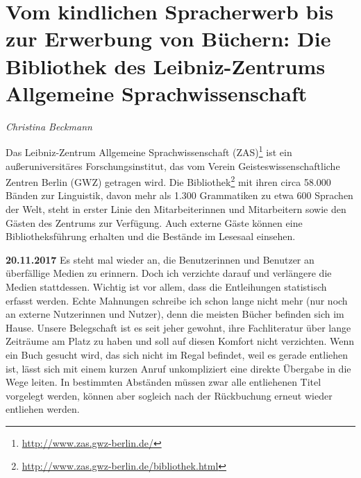 \documentclass[a4paper,
fontsize=11pt,
oneside,
numbers=noperiodatend,
parskip=half-,
bibliography=totoc,
final
]{scrartcl}
\begin{document}
\newpage

\hypertarget{vom-kindlichen-spracherwerb-bis-zur-erwerbung-von-buxfcchern-die-bibliothek-des-leibniz-zentrums-allgemeine-sprachwissenschaft}{%
\section*{Vom kindlichen Spracherwerb bis zur Erwerbung von
Büchern: Die Bibliothek des Leibniz-Zentrums Allgemeine
Sprachwissenschaft}\label{vom-kindlichen-spracherwerb-bis-zur-erwerbung-von-buxfcchern-die-bibliothek-des-leibniz-zentrums-allgemeine-sprachwissenschaft}}

\emph{Christina Beckmann}

Das Leibniz-Zentrum Allgemeine Sprachwissenschaft (ZAS)\footnote{\url{http://www.zas.gwz-berlin.de/}}
ist ein außeruniversitäres Forschungsinstitut, das vom Verein
Geisteswissenschaftliche Zentren Berlin (GWZ) getragen wird. Die
Bibliothek\footnote{\url{http://www.zas.gwz-berlin.de/bibliothek.html}}
mit ihren circa 58.000 Bänden zur Linguistik, davon mehr als 1.300
Grammatiken zu etwa 600 Sprachen der Welt, steht in erster Linie den
Mitarbeiterinnen und Mitarbeitern sowie den Gästen des Zentrums zur
Verfügung. Auch externe Gäste können eine Bibliotheksführung erhalten
und die Bestände im Lesesaal einsehen.

\textbf{20.11.2017} Es steht mal wieder an, die Benutzerinnen und
Benutzer an überfällige Medien zu erinnern. Doch ich verzichte darauf
und verlängere die Medien stattdessen. Wichtig ist vor allem, dass die
Entleihungen statistisch erfasst werden. Echte Mahnungen schreibe ich
schon lange nicht mehr (nur noch an externe Nutzerinnen und Nutzer),
denn die meisten Bücher befinden sich im Hause. Unsere Belegschaft ist
es seit jeher gewohnt, ihre Fachliteratur über lange Zeiträume am Platz
zu haben und soll auf diesen Komfort nicht verzichten. Wenn ein Buch
gesucht wird, das sich nicht im Regal befindet, weil es gerade entliehen
ist, lässt sich mit einem kurzen Anruf unkompliziert eine direkte
Übergabe in die Wege leiten. In bestimmten Abständen müssen zwar alle
entliehenen Titel vorgelegt werden, können aber sogleich nach der
Rückbuchung erneut wieder entliehen werden.
\end{document}

